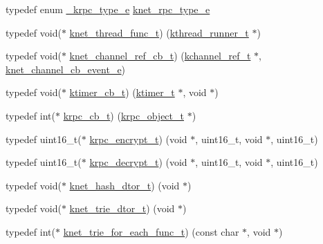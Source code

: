 \begin{DoxyCompactItemize}
\item 
typedef enum \hyperlink{a00054_aa250e66ac76155c15e3e1d24d0431931_aa250e66ac76155c15e3e1d24d0431931}{\+\_\+krpc\+\_\+type\+\_\+e} \hyperlink{a00054_a6fe1ebc0ddea56dd3c337115c1e10bc4_a6fe1ebc0ddea56dd3c337115c1e10bc4}{knet\+\_\+rpc\+\_\+type\+\_\+e}
\item 
typedef void($\ast$ \hyperlink{a00054_a8741dac4a9f8d97603eb3a30a3473b13_a8741dac4a9f8d97603eb3a30a3473b13}{knet\+\_\+thread\+\_\+func\+\_\+t}) (\hyperlink{a00054_a4f78c259c9527c821f1a6f87495dd339_a4f78c259c9527c821f1a6f87495dd339}{kthread\+\_\+runner\+\_\+t} $\ast$)
\item 
typedef void($\ast$ \hyperlink{a00054_a8a7d96123ef4565c6d08fe58a10476a9_a8a7d96123ef4565c6d08fe58a10476a9}{knet\+\_\+channel\+\_\+ref\+\_\+cb\+\_\+t}) (\hyperlink{a00054_a3b7e82599367eade261456f60ebe2cd9_a3b7e82599367eade261456f60ebe2cd9}{kchannel\+\_\+ref\+\_\+t} $\ast$, \hyperlink{a00054_a2fd2faf971268f5b682ab375c455f7c9_a2fd2faf971268f5b682ab375c455f7c9}{knet\+\_\+channel\+\_\+cb\+\_\+event\+\_\+e})
\item 
typedef void($\ast$ \hyperlink{a00054_a2333fd0f2c3a85faf586300ca40deed4_a2333fd0f2c3a85faf586300ca40deed4}{ktimer\+\_\+cb\+\_\+t}) (\hyperlink{a00054_a846172ea4e8a86449eca41a3d8e074b7_a846172ea4e8a86449eca41a3d8e074b7}{ktimer\+\_\+t} $\ast$, void $\ast$)
\item 
typedef int($\ast$ \hyperlink{a00054_a06bb708c1b97445d3a5d0c1b32ad2ab6_a06bb708c1b97445d3a5d0c1b32ad2ab6}{krpc\+\_\+cb\+\_\+t}) (\hyperlink{a00054_a9c07dfc8c3b965f75b09f82fdb1bbb1e_a9c07dfc8c3b965f75b09f82fdb1bbb1e}{krpc\+\_\+object\+\_\+t} $\ast$)
\item 
typedef uint16\+\_\+t($\ast$ \hyperlink{a00054_ae41a67cc07f8dff897ca978e03b1f2d7_ae41a67cc07f8dff897ca978e03b1f2d7}{krpc\+\_\+encrypt\+\_\+t}) (void $\ast$, uint16\+\_\+t, void $\ast$, uint16\+\_\+t)
\item 
typedef uint16\+\_\+t($\ast$ \hyperlink{a00054_a5cf750f151c90f0589f68fe8c4421f1d_a5cf750f151c90f0589f68fe8c4421f1d}{krpc\+\_\+decrypt\+\_\+t}) (void $\ast$, uint16\+\_\+t, void $\ast$, uint16\+\_\+t)
\item 
typedef void($\ast$ \hyperlink{a00054_af806592520383146be2f3aac316beb45_af806592520383146be2f3aac316beb45}{knet\+\_\+hash\+\_\+dtor\+\_\+t}) (void $\ast$)
\item 
typedef void($\ast$ \hyperlink{a00054_a46741b0dab7bbb26d611c429ee64d78c_a46741b0dab7bbb26d611c429ee64d78c}{knet\+\_\+trie\+\_\+dtor\+\_\+t}) (void $\ast$)
\item 
typedef int($\ast$ \hyperlink{a00054_ad77af676ce15810f8f713bb3eaa91fe8_ad77af676ce15810f8f713bb3eaa91fe8}{knet\+\_\+trie\+\_\+for\+\_\+each\+\_\+func\+\_\+t}) (const char $\ast$, void $\ast$)
\end{DoxyCompactItemize}
